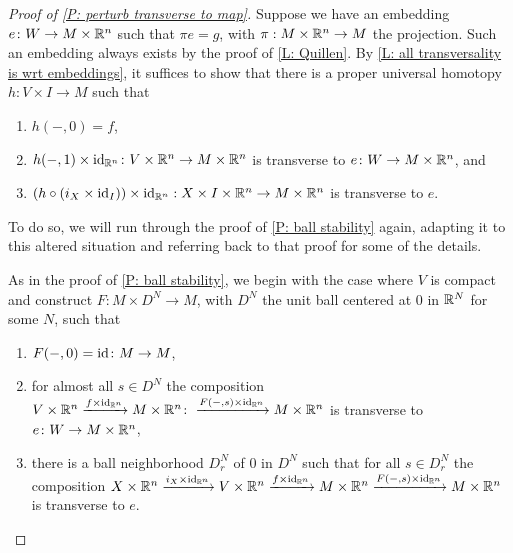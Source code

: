 \begin{proof}[Proof of \cref{P: perturb transverse to map}]
Suppose we have an embedding $e \colon W \to M \times \mathbb{R}^n$ such that $\pi e = g$, with $\pi: M \times \mathbb{R}^n \to M$ the projection. Such an embedding always exists by the proof of \cref{L: Quillen}. By \cref{L: all transversality is wrt embeddings}, it suffices to show that there is a proper universal homotopy $h \colon V \times I \to M$ such that

\begin{enumerate}
\item $h(-,0) = f$,
\item $h(-,1) \times \mathrm{id}_{\mathbb{R}^n} \colon V \times \mathbb{R}^n \to M \times \mathbb{R}^n$ is transverse to $e \colon W \to M \times \mathbb{R}^n$, and
\item $(h\circ(i_{X} \times \mathrm{id}_I))\times\mathrm{id}_{\mathbb{R}^n}: X \times I \times \mathbb{R}^n \to M \times \mathbb{R}^n$ is transverse to $e$.
\end{enumerate}
To do so, we will run through the proof of \cref{P: ball stability} again, adapting it to this altered situation and referring back to that proof for some of the details. 


As in the proof of \cref{P: ball stability}, we begin with the case where $V$ is compact and construct $F \colon M \times D^N \to M$, with $D^N$ the unit ball centered at $0$ in $\mathbb{R}^N$ for some $N$, such that

\begin{enumerate}

\item $F(-,0) = \mathrm{id} \colon M \to M$,
\item for almost all $s \in D^N$ the composition $V \times \mathbb{R}^n \xrightarrow{f \times \mathrm{id}_{\mathbb{R}^n}} M \times \mathbb{R}^n\colon\xrightarrow{F(-,s) \times \mathrm{id}_{\mathbb{R}^n}}M \times \mathbb{R}^n$ is transverse to $e \colon W \to M \times \mathbb{R}^n$,

\item there is a ball neighborhood $D_r^N$ of $0$ in $D^N$ such that for all $s \in D_r^N$ the composition $X \times \mathbb{R}^n \xrightarrow{i_{X} \times \mathrm{id}_{\mathbb{R}^n}} V \times \mathbb{R}^n \xrightarrow{f \times \mathrm{id}_{\mathbb{R}^n}} M \times \mathbb{R}^n \xrightarrow{F(-,s) \times \mathrm{id}_{\mathbb{R}^n}}M \times \mathbb{R}^n$ is transverse to $e$.
\end{enumerate}


\end{proof}
